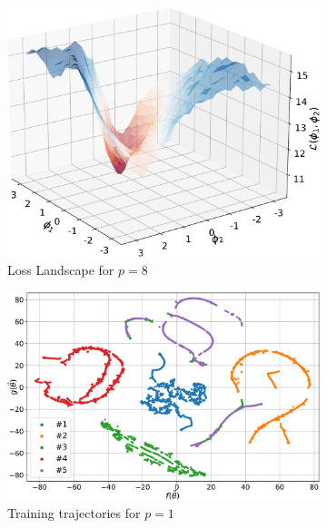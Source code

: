 \documentclass[%
 reprint,
 amsmath,
 amssymb,
 showkeys,
 pra,
 floatfix,
]{revtex4-2}
\begin{document}
\begin{figure}[htp]
\begin{subfigure}[b]{0.32\linewidth}
    \end{subfigure}
    \begin{subfigure}[b]{0.32\linewidth}
        \includegraphics[width=\textwidth]{images/loss_landscape_p3.pdf}
        \caption{Loss Landscape for $p=8$\label{fig:loss-p8}}
    \end{subfigure}%
    \hfill\newline
    \begin{subfigure}[b]{0.32\linewidth}
        \includegraphics[width=\textwidth]{images/training_trajectory_p1.pdf}
        \caption{Training trajectories for $p=1$\label{fig:train-p1}}
    \end{subfigure}
    \begin{subfigure}[b]{0.32\linewidth}

\end{subfigure}
\end{figure}
\end{document}
